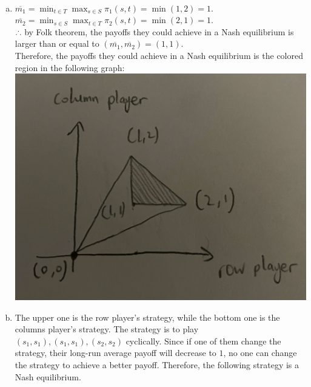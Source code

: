 \begin{pr}$ $
\begin{enumerate}[(a)]
\item $\overline{m_1}=\min_{t\in T}\max_{s\in S}\pi_1(s, t)=\min(1, 2)=1$.\\
$\overline{m_2}=\min_{s\in S}\max_{t\in T}\pi_2(s, t)=\min(2, 1)=1$.\\
$\therefore$ by Folk theorem, the payoffs they could achieve in a Nash equilibrium is larger than or equal to $(\overline{m_1}, \overline{m_2})=(1, 1)$.\\
Therefore, the payoffs they could achieve in a Nash equilibrium is the colored region in the following graph:\\
\includegraphics[width=15cm]{1a.JPG}
\item The upper one is the row player's strategy, while the bottom one is the columns player's strategy. The strategy is to play $(s_1, s_1), (s_1, s_1), (s_2, s_2)$ cyclically. Since if one of them change the strategy, their long-run average payoff will decrease to $1$, no one can change the strategy to achieve a better payoff. Therefore, the following strategy is a Nash equilibrium.\\

\end{enumerate}
\end{pr}
